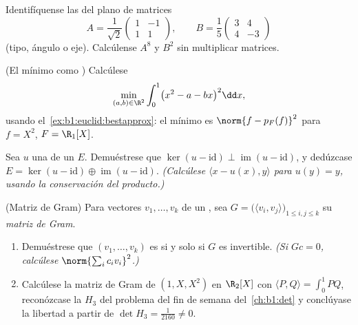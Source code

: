 \begin{exercise}[$\star\star$]\label{exo:b1:euclid:8}
Identifíquense las  del plano de matrices
\[
A = \frac{1}{\sqrt 2}\begin{pmatrix} 1 & -1\\ 1 & 1\end{pmatrix},
\qquad
B = \frac{1}{5}\begin{pmatrix} 3 & 4\\ 4 & -3\end{pmatrix}
\]
(tipo, ángulo o eje). Calcúlense $A^8$ y $B^2$ sin multiplicar
matrices.
\end{exercise}

\begin{exercise}[$\star\star\star$]\label{exo:b1:euclid:9}
(El mínimo como ) Calcúlese
\[
\min_{(a, b) \in \R^2} \int_0^1 \bigl(x^2 - a - bx\bigr)^2 \dd x ,
\]
usando el~\cref{ex:b1:euclid:bestapprox}: el mínimo es
$\norm{f - p_F(f)}^2$ para $f = X^2$, $F = \R_1[X]$.
\end{exercise}

\begin{exercise}[$\star\star\star$]\label{exo:b1:euclid:10}
Sea $u$ una  de un  $E$. Demuéstrese que
$\ker(u - \mathrm{id}) \perp \operatorname{im}(u - \mathrm{id})$, y
dedúzcase
$E = \ker(u - \mathrm{id}) \oplus \operatorname{im}(u -
\mathrm{id})$. \emph{(Calcúlese $\langle x - u(x), y\rangle$ para
$u(y) = y$, usando la conservación del producto.)}
\end{exercise}

\begin{exercise}[$\star\star$]\label{exo:b1:euclid:11}
(Matriz de Gram) Para vectores $v_1, \dots, v_k$ de un , sea
$G = \bigl(\langle v_i, v_j\rangle\bigr)_{1 \leq i, j \leq k}$ su
\emph{matriz de Gram}.
\begin{enumerate}
  \item Demuéstrese que $(v_1, \dots, v_k)$ es  si y solo si
        $G$ es invertible. \emph{(Si $Gc = 0$, calcúlese
        $\norm{\sum_i c_i v_i}^2$.)}
  \item Calcúlese la matriz de Gram de $(1, X, X^2)$ en $\R_2[X]$
        con $\langle P, Q\rangle = \int_0^1 PQ$, reconózcase la
         $H_3$ del problema del fin de semana
        del~\cref{ch:b1:det} y conclúyase la libertad a partir de
        $\det H_3 = \frac1{2160} \neq 0$.
\end{enumerate}
\end{exercise}

